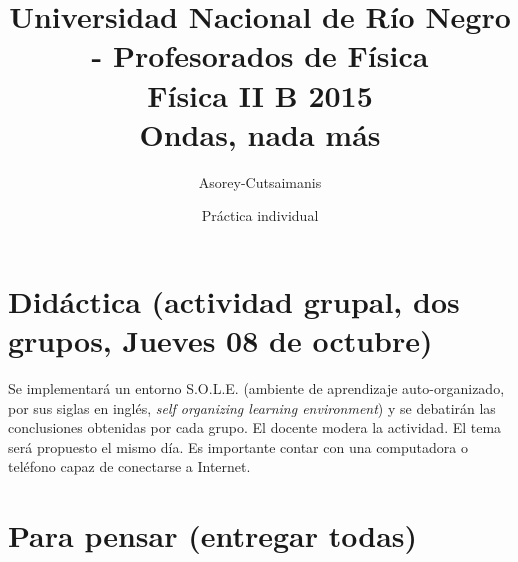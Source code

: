 \documentclass[a4paper,12pt]{article}
\begin{document}
\title{
{\normalsize{Universidad Nacional de Río Negro - Profesorados de Física}}\\
Física II B 2015\\Ondas, nada más\\}
\author{Asorey-Cutsaimanis}
\date{Práctica individual}
\maketitle

\section{Didáctica (actividad grupal, dos grupos, Jueves 08 de octubre)}

Se implementará un entorno S.O.L.E. (ambiente de aprendizaje auto-organizado,
por sus siglas en inglés, {\emph{self organizing learning environment}}) y se
debatirán las conclusiones obtenidas por cada grupo. El docente modera la
actividad. El tema será propuesto el mismo día. Es importante contar con una
computadora o teléfono capaz de conectarse a Internet.

\section{Para pensar (entregar todas)}
\end{document}
